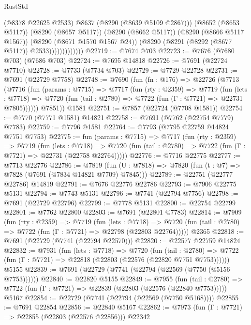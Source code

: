 \begin{lexlean}{RustStd}
\begin{coremodule}
                            (@8378 @22625 @2533)
                            @8637
                            (@8290 (@8639 @5109 @2867)))
                          (@8652 (@8653 @5117))
                          (@8290 (@8657 @5117))
                          (@8290 (@8662 @5117))
                          (@8290 (@8666 @5117 @1567))
                          (@8290 (@8671 @1570 @1567 @24))
                          (@8290 (@8291 (@8292 (@8677 @5117)) @2533)))))))))))))
@22719 := @7674 @703
@22723 := @7676 (@7680 @703) (@7686 @703)
@22724 := @7695 @14818
@22726 := @7691 (@22724 @7710)
@22728 := @7733 (@7734 @703)
@22729 := @7729 @22728
@22731 := @7691 (@22729 @7758)
@22748 := @7690
    (fun (fn : @176) =>
    @22726
      (@7713
        (@7716
          (fun (params : @7715) =>
          @7717
            (fun (rty : @2359) =>
            @7719
              (fun (lets : @7718) =>
              @7720 (fun (tail : @2780) => @7722 (fun (Γ : @7721) => @22731 @7805))))))
        @7851))
    @1581
@22751 := @7857 (@22724 (@7708 @1581))
@22754 := @7770 (@7771 @1581) @14821
@22758 := @7691 (@7762 (@22754 @7779) @7783)
@22759 := @7796 @1581
@22764 := @7793 (@7795 @22759 @14824 @7751 @7753)
@22775 := fun (params : @7715) =>
  @7717
    (fun (rty : @2359) =>
    @7719
      (fun (lets : @7718) =>
      @7720 (fun (tail : @2780) => @7722 (fun (Γ : @7721) => @22731 (@22758 @22764)))))
@22776 := @7716 @22775
@22777 := @7713 @22776
@22786 := @7819
    (fun (U : @7818) => @7820 (fun (t : @7) => @7828 (@7691 (@7834 @14821 @7709) @7845)))
@22789 := @22751 (@22777 @22786) @14819
@22791 := @7676 @22776 @22786
@22793 := @7906 @22775 @5131
@22794 := @7743 @5131
@22796 := @7741 (@22794 @7756)
@22798 := @7691 (@22729 @22796)
@22799 := @7778 @5131
@22800 := @22754 @22799
@22801 := @7762 @22800
@22803 := @7691 (@22801 @7783)
@22814 := @7909
    (fun (rty : @2359) =>
    @7719
      (fun (lets : @7718) =>
      @7720 (fun (tail : @2780) => @7722 (fun (Γ : @7721) => @22798 (@22803 @22764)))))
    @2365
@22818 := @7691 (@22729 (@7741 (@22794 @22570)))
@22820 := @22577 @22759 @14824
@22832 := @7931
    (fun (lets : @7718) =>
    @7720
      (fun (tail : @2780) =>
      @7722 (fun (Γ : @7721) => @22818 (@22803 (@22576 (@22820 @7751 @7753))))))
    @5155
@22839 := @7691 (@22729 (@7741 (@22794 (@22569 (@7750 (@5156 @7753))))))
@22840 := @22820 @5155
@22849 := @7955
    (fun (tail : @2780) => @7722 (fun (Γ : @7721) => @22839 (@22803 (@22576 (@22840 @7753)))))
    @5167
@22854 := @22729 (@7741 (@22794 (@22569 (@7750 @5168))))
@22855 := @7691 @22854
@22856 := @22840 @5167
@22862 := @7973 (fun (Γ : @7721) => @22855 (@22803 (@22576 @22856))) @22342

\end{coremodule}
\end{lexlean}
